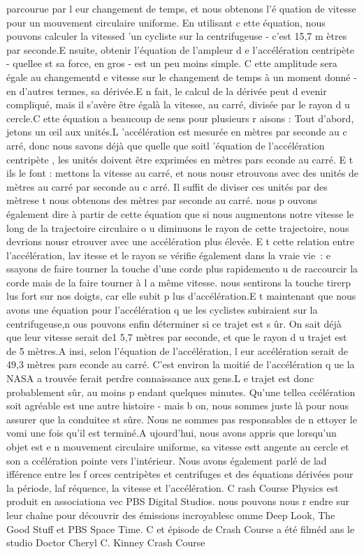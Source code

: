 \documentclass[a4paper, twoside]{article}
\begin{document}
parcourue par l eur changement de temps, et nous obtenons l'é quation de
vitesse pour un mouvement circulaire uniforme. En utilisant c ette
équation, nous pouvons calculer la vitessed 'un cycliste sur la
centrifugeuse - c'est 15,7 m ètres par seconde.E nsuite, obtenir
l'équation de l'ampleur d e l'accélération centripète - quellee st sa
force, en gros - est un peu moins simple. C ette amplitude sera égale au
changementd e vitesse sur le changement de temps à un moment donné - en
d'autres termes, sa dérivée.E n fait, le calcul de la dérivée peut d
evenir compliqué, mais il s'avère être égalà la vitesse, au carré,
divisée par le rayon d u cercle.C ette équation a beaucoup de sens pour
plusieurs r aisons : Tout d'abord, jetons un œil aux unités.L
'accélération est mesurée en mètres par seconde au c arré, donc nous
savons déjà que quelle que soitl 'équation de l'accélération centripète
, les unités doivent être exprimées en mètres pars econde au carré. E t
ils le font : mettons la vitesse au carré, et nous nousr etrouvons avec
des unités de mètres au carré par seconde au c arré. Il suffit de
diviser ces unités par des mètrese t nous obtenons des mètres par
seconde au carré. nous p ouvons également dire à partir de cette
équation que si nous augmentons notre vitesse le long de la trajectoire
circulaire o u diminuons le rayon de cette trajectoire, nous devrions
nousr etrouver avec une accélération plus élevée. E t cette relation
entre l'accélération, lav itesse et le rayon se vérifie également dans
la vraie vie~: e ssayons de faire tourner la touche d'une corde plus
rapidemento u de raccourcir la corde mais de la faire tourner à l a même
vitesse. nous sentirons la touche tirerp lus fort sur nos doigts, car
elle subit p lus d'accélération.E t maintenant que nous avons une
équation pour l'accélération q ue les cyclistes subiraient sur la
centrifugeuse,n ous pouvons enfin déterminer si ce trajet est s ûr. On
sait déjà que leur vitesse serait de1 5,7 mètres par seconde, et que le
rayon d u trajet est de 5 mètres.A insi, selon l'équation de
l'accélération, l eur accélération serait de 49,3 mètres pars econde au
carré. C'est environ la moitié de l'accélération q ue la NASA a trouvée
ferait perdre connaissance aux gens.L e trajet est donc probablement
sûr, au moins p endant quelques minutes. Qu'une tellea ccélération soit
agréable est une autre histoire - mais b on, nous sommes juste là pour
nous assurer que la conduitee st sûre. Nous ne sommes pas responsables
de n ettoyer le vomi une fois qu'il est terminé.A ujourd'hui, nous avons
appris que lorsqu'un objet est e n mouvement circulaire uniforme, sa
vitesse estt angente au cercle et son a ccélération pointe vers
l'intérieur. Nous avons également parlé de lad ifférence entre les f
orces centripètes et centrifuges et des équations dérivées pour la
période, laf réquence, la vitesse et l'accélération. C rash Course
Physics est produit en associationa vec PBS Digital Studios. nous
pouvons nous r endre sur leur chaîne pour découvrir des émissions
incroyablesc omme Deep Look, The Good Stuff et PBS Space Time. C et
épisode de Crash Course a été filméd ans le studio Doctor Cheryl C.
Kinney Crash Course
\end{document}
